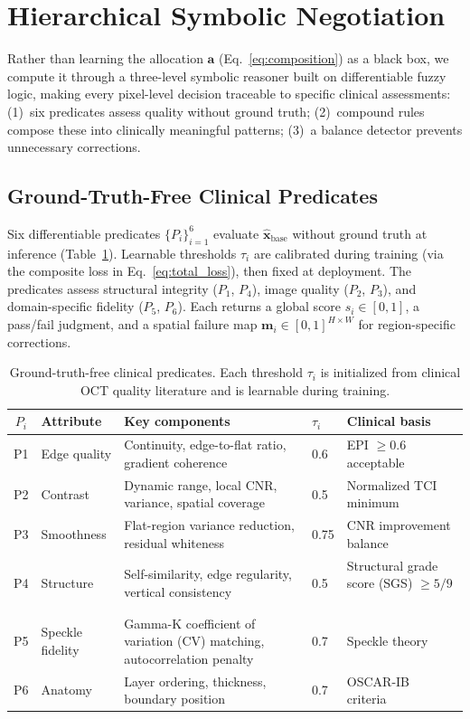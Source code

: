 \documentclass[journal,twoside,web]{ieeecolor}
\begin{document}
\section{Hierarchical Symbolic Negotiation}
\label{sec:negotiator}

Rather than learning the allocation $\mathbf{a}$ (Eq.~\eqref{eq:composition}) as a black box, we compute it through a three-level symbolic reasoner built on differentiable fuzzy logic, making every pixel-level decision traceable to specific clinical assessments: (1)~six predicates assess quality without ground truth; (2)~compound rules compose these into clinically meaningful patterns; (3)~a balance detector prevents unnecessary corrections.

\subsection{Ground-Truth-Free Clinical Predicates}
\label{sec:predicates}
Six differentiable predicates $\{P_i\}_{i=1}^{6}$ evaluate $\hat{\mathbf{x}}_\text{base}$ without ground truth at inference (Table~\ref{tab:predicates}). Learnable thresholds $\tau_i$ are calibrated during training (via the composite loss in Eq.~\eqref{eq:total_loss}), then fixed at deployment. The predicates assess structural integrity ($P_1$, $P_4$), image quality ($P_2$, $P_3$), and domain-specific fidelity ($P_5$, $P_6$). Each returns a global score $s_i \in [0,1]$, a pass/fail judgment, and a spatial failure map $\mathbf{m}_i \in [0,1]^{H \times W}$ for region-specific corrections.

\begin{table}[t]
\centering
\caption{Ground-truth-free clinical predicates. Each threshold $\tau_i$ is initialized from clinical OCT quality literature and is learnable during training.}
\label{tab:predicates}
\setlength{\tabcolsep}{3pt}
\begin{tabular}{cllll}
\toprule
$P_i$ & Attribute & Key components & $\tau_i$ & Clinical basis \\
\midrule
P1 & Edge quality & Continuity, edge-to-flat ratio, gradient coherence & 0.6 & EPI $\geq 0.6$ acceptable~\cite{stein2006quality} \\
P2 & Contrast & Dynamic range, local CNR, variance, spatial coverage & 0.5 & Normalized TCI minimum~\cite{stein2006quality} \\
P3 & Smoothness & Flat-region variance reduction, residual whiteness & 0.75 & CNR improvement balance~\cite{wang2019quality} \\
P4 & Structure & Self-similarity, edge regularity, vertical consistency & 0.5 & Structural grade score (SGS) $\geq 5/9$~\cite{stein2006quality} \\
P5 & Speckle fidelity & Gamma-K coefficient of variation (CV) matching, autocorrelation penalty & 0.7 & Speckle theory~\cite{goodman2007speckle} \\
P6 & Anatomy & Layer ordering, thickness, boundary position & 0.7 & OSCAR-IB criteria~\cite{tewarie2012oscar} \\
\bottomrule
\end{tabular}
\end{table}
\end{document}
